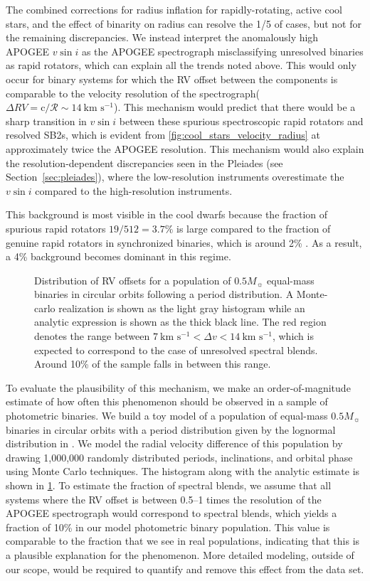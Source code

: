 \documentclass[preprint2]{aastex62}
\newcommand{\vsini}{\ensuremath{v \sin i}}
\newcommand{\kms}{\textrm{km~s}\ensuremath{^{-1}}}
\begin{document}
The combined corrections for radius
inflation for rapidly-rotating, active cool stars, and the effect of binarity 
on radius can resolve the 1/5 of cases, but not for the remaining discrepancies. 
We instead interpret the anomalously high APOGEE 
\vsini{} as the APOGEE spectrograph misclassifying unresolved binaries as rapid 
rotators, which can explain all the trends noted above. This would only occur for
binary systems for which the RV offset between the components is comparable to 
the velocity resolution of the spectrograph(\(\Delta RV = 
\textrm{c}/\mathcal{R} \sim 14~\kms\)). This mechanism would predict that there 
would be a sharp transition in \vsini{} between these spurious spectroscopic 
rapid rotators and resolved SB2s, which is evident from
\cref{fig:cool_stars_velocity_radius} at approximately twice the APOGEE
resolution. This mechanism would also explain the resolution-dependent
discrepancies seen in the Pleiades (see Section~\ref{sec:pleiades}), where the 
low-resolution instruments overestimate the \vsini{} compared to the 
high-resolution instruments.

This background is most visible in the cool dwarfs because the fraction of 
spurious rapid rotators \(19 / 512 = 3.7\%\) is large compared to the fraction 
of genuine rapid rotators in synchronized binaries, which is around 2\%
\citep{Simonian19}. As a result, a 4\% background becomes dominant in this
regime. 

\begin{figure}[htb]
    \centering
    \caption{Distribution of RV offsets for a population of \(0.5 M_\sun\)
    equal-mass binaries in circular orbits following a \citet{Raghavan10}
    period distribution. A Monte-carlo realization is shown as the light gray
    histogram while an analytic expression is shown as the thick black line.
    The red region denotes the range between \(7~\kms < \Delta v < 14~\kms\),
    which is expected to correspond to the case of unresolved spectral blends.
    Around 10\% of the sample falls in between this range.
\label{fig:phot_cont}}
\end{figure}

To evaluate the plausibility of this mechanism, we make an order-of-magnitude 
estimate of how often this phenomenon should be observed in a
sample of photometric binaries. We build a toy model of a population of
equal-mass \(0.5 M_\sun\) binaries in circular orbits with a period 
distribution given by the lognormal distribution in \citet{Raghavan10}. We 
model the radial velocity difference of this population by drawing 1,000,000 
randomly distributed periods, inclinations, and orbital phase using Monte 
Carlo techniques. The histogram along with the analytic estimate is shown in
\cref{fig:phot_cont}. To estimate the fraction of spectral blends, we assume 
that all systems where the RV offset is between 0.5--1 times the resolution of 
the APOGEE spectrograph would correspond to spectral blends, which yields a
fraction of 10\% in our model photometric binary population. This value is 
comparable to the fraction that we see in real populations, indicating that 
this is a plausible
explanation for the phenomenon. More detailed modeling, outside of our scope,
would be required to quantify and remove this effect from the data set.
\end{document}
